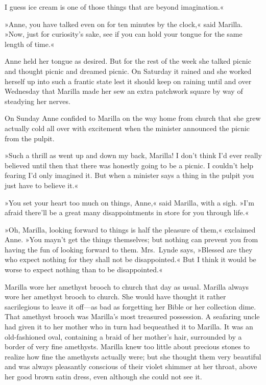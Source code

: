 I guess ice cream is one of those things that are beyond imagination.«

»Anne, you have talked even on for ten minutes by the clock,« said Marilla. »Now, just for curiosity's sake, see if you can hold your tongue for the same length of time.«

Anne held her tongue as desired. But for the rest of the week she talked picnic and thought picnic and dreamed picnic. On Saturday it rained and she worked herself up into such a frantic state lest it should keep on raining until and over Wednesday that Marilla made her sew an extra patchwork square by way of steadying her nerves.

On Sunday Anne confided to Marilla on the way home from church that she grew actually cold all over with excitement when the minister announced the picnic from the pulpit.

»Such a thrill as went up and down my back, Marilla! I don't think I'd ever really believed until then that there was honestly going to be a picnic. I couldn't help fearing I'd only imagined it. But when a minister says a thing in the pulpit you just have to believe it.«

»You set your heart too much on things, Anne,« said Marilla, with a sigh. »I'm afraid there'll be a great many disappointments in store for you through life.«

»Oh, Marilla, looking forward to things is half the pleasure of them,« exclaimed Anne. »You mayn't get the things themselves; but nothing can prevent you from having the fun of looking forward to them. Mrs.~Lynde says, »Blessed are they who expect nothing for they shall not be disappointed.« But I think it would be worse to expect nothing than to be disappointed.«

Marilla wore her amethyst brooch to church that day as usual. Marilla always wore her amethyst brooch to church. She would have thought it rather sacrilegious to leave it off—as bad as forgetting her Bible or her collection dime. That amethyst brooch was Marilla's most treasured possession. A seafaring uncle had given it to her mother who in turn had bequeathed it to Marilla. It was an old-fashioned oval, containing a braid of her mother's hair, surrounded by a border of very fine amethysts. Marilla knew too little about precious stones to realize how fine the amethysts actually were; but she thought them very beautiful and was always pleasantly conscious of their violet shimmer at her throat, above her good brown satin dress, even although she could not see it.

